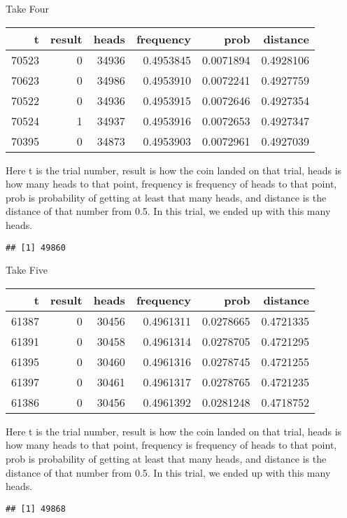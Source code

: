 \documentclass[
  ignorenonframetext,
]{beamer}
\renewcommand{\,}{\text{, }}
\begin{document}
\begin{frame}[fragile]{Take Four}
\protect\hypertarget{take-four}{}

\begin{longtable}[]{@{}rrrrrr@{}}
\toprule
t & result & heads & frequency & prob & distance\tabularnewline
\midrule
\endhead
70523 & 0 & 34936 & 0.4953845 & 0.0071894 & 0.4928106\tabularnewline
70623 & 0 & 34986 & 0.4953910 & 0.0072241 & 0.4927759\tabularnewline
70522 & 0 & 34936 & 0.4953915 & 0.0072646 & 0.4927354\tabularnewline
70524 & 1 & 34937 & 0.4953916 & 0.0072653 & 0.4927347\tabularnewline
70395 & 0 & 34873 & 0.4953903 & 0.0072961 & 0.4927039\tabularnewline
\bottomrule
\end{longtable}

Here t is the trial number, result is how the coin landed on that trial,
heads is how many heads to that point, frequency is frequency of heads
to that point, prob is probability of getting at least that many heads,
and distance is the distance of that number from 0.5. In this trial, we
ended up with this many heads.

\begin{verbatim}
## [1] 49860
\end{verbatim}

\end{frame}

\begin{frame}[fragile]{Take Five}
\protect\hypertarget{take-five}{}

\begin{longtable}[]{@{}rrrrrr@{}}
\toprule
t & result & heads & frequency & prob & distance\tabularnewline
\midrule
\endhead
61387 & 0 & 30456 & 0.4961311 & 0.0278665 & 0.4721335\tabularnewline
61391 & 0 & 30458 & 0.4961314 & 0.0278705 & 0.4721295\tabularnewline
61395 & 0 & 30460 & 0.4961316 & 0.0278745 & 0.4721255\tabularnewline
61397 & 0 & 30461 & 0.4961317 & 0.0278765 & 0.4721235\tabularnewline
61386 & 0 & 30456 & 0.4961392 & 0.0281248 & 0.4718752\tabularnewline
\bottomrule
\end{longtable}

Here t is the trial number, result is how the coin landed on that trial,
heads is how many heads to that point, frequency is frequency of heads
to that point, prob is probability of getting at least that many heads,
and distance is the distance of that number from 0.5. In this trial, we
ended up with this many heads.

\begin{verbatim}
## [1] 49868
\end{verbatim}

\end{frame}
\end{document}
